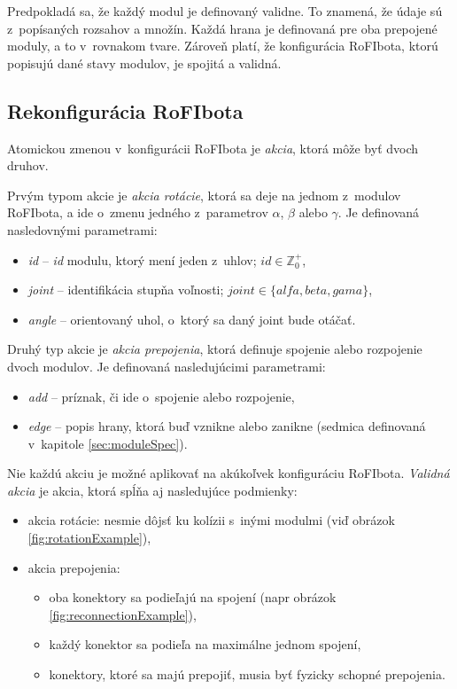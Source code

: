 \documentclass[
  printed, %
  oneside, %
  notable,   %
  nolof,     %
  nolot,     %
]{fithesis3}
\begin{document}
Predpokladá sa, že každý modul je definovaný validne. To znamená, že údaje sú z~popísaných rozsahov a množín. Každá hrana je definovaná pre oba prepojené moduly, a to v~rovnakom tvare. Zároveň platí, že konfigurácia RoFIbota, ktorú popisujú dané stavy modulov, je spojitá a validná. 

\subsection{Rekonfigurácia RoFIbota}
\label{sec:formalRecfg}
Atomickou zmenou v~konfigurácii RoFIbota je \textit{akcia}, ktorá môže byť dvoch druhov. 

Prvým typom akcie je \textit{akcia rotácie}, ktorá sa deje na jednom z~modulov RoFIbota, a ide o~zmenu jedného z~parametrov $\alpha$, $\beta$ alebo $\gamma$. Je definovaná nasledovnými parametrami: 
\begin{itemize}
    \item \textit{id} -- \textit{id} modulu, ktorý mení jeden z~uhlov; $id \in \mathbb{Z}_0^+$, 
    \item \textit{joint} -- identifikácia stupňa voľnosti; $joint \in \{alfa, beta, gama\}$, 
    \item \textit{angle} -- orientovaný uhol, o~ktorý sa daný joint bude otáčať. 
\end{itemize}

Druhý typ akcie je \textit{akcia prepojenia}, ktorá definuje spojenie alebo rozpojenie dvoch modulov. Je definovaná nasledujúcimi parametrami: 
\begin{itemize}
    \item \textit{add} -- príznak, či ide o~spojenie alebo rozpojenie,
    \item \textit{edge} -- popis hrany, ktorá buď vznikne alebo zanikne (sedmica definovaná v~kapitole \ref{sec:moduleSpec}). 
\end{itemize}

Nie každú akciu je možné aplikovať na akúkoľvek konfiguráciu RoFIbota. \textit{Validná akcia} je akcia, ktorá spĺňa aj nasledujúce podmienky:
\begin{itemize}
    \item akcia rotácie: nesmie dôjsť ku kolízii s~inými modulmi (viď obrázok \ref{fig:rotationExample}), 
    \item akcia prepojenia: 
    \begin{itemize}[topsep=-5pt]
        \item oba konektory sa podieľajú na spojení (napr obrázok \ref{fig:reconnectionExample}), 
        \item každý konektor sa podieľa na maximálne jednom spojení,
        \item konektory, ktoré sa majú prepojiť, musia byť fyzicky schopné prepojenia.
    \end{itemize}
\end{itemize}
\end{document}
